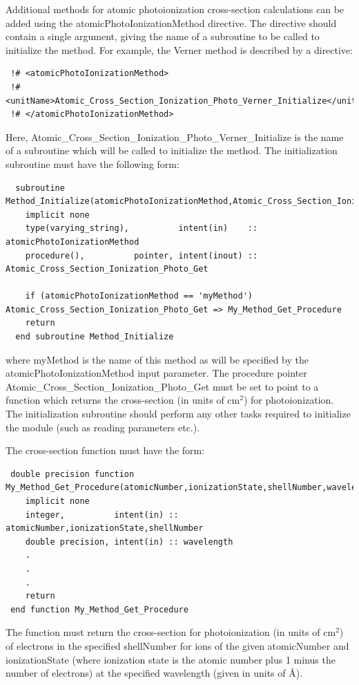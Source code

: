 Additional methods for atomic photoionization cross-section calculations can be added using the {\normalfont \ttfamily atomicPhotoIonizationMethod} directive. The directive should contain a single argument, giving the name of a subroutine to be called to initialize the method. For example, the {\normalfont \ttfamily Verner} method is described by a directive:
\begin{verbatim}
 !# <atomicPhotoIonizationMethod>
 !#  <unitName>Atomic_Cross_Section_Ionization_Photo_Verner_Initialize</unitName>
 !# </atomicPhotoIonizationMethod>
\end{verbatim}
Here, {\normalfont \ttfamily Atomic\_Cross\_Section\_Ionization\_Photo\_Verner\_Initialize} is the name of a subroutine which will be called to initialize the method. The initialization subroutine must have the following form:
\begin{verbatim}
  subroutine Method_Initialize(atomicPhotoIonizationMethod,Atomic_Cross_Section_Ionization_Photo_Get)
    implicit none
    type(varying_string),          intent(in)    :: atomicPhotoIonizationMethod
    procedure(),          pointer, intent(inout) :: Atomic_Cross_Section_Ionization_Photo_Get
    
    if (atomicPhotoIonizationMethod == 'myMethod') Atomic_Cross_Section_Ionization_Photo_Get => My_Method_Get_Procedure
    return
  end subroutine Method_Initialize
\end{verbatim}
where {\normalfont \ttfamily myMethod} is the name of this method as will be specified by the {\normalfont \ttfamily atomicPhotoIonizationMethod} input parameter. The procedure pointer {\normalfont \ttfamily Atomic\_Cross\_Section\_Ionization\_Photo\_Get} must be set to point to a function which returns the cross-section (in units of cm$^2$) for photoionization. The initialization subroutine should perform any other tasks required to initialize the module (such as reading parameters etc.).

The cross-section function must have the form:
\begin{verbatim}
 double precision function My_Method_Get_Procedure(atomicNumber,ionizationState,shellNumber,wavelength)
    implicit none
    integer,          intent(in) :: atomicNumber,ionizationState,shellNumber
    double precision, intent(in) :: wavelength
    .
    .
    .
    return
 end function My_Method_Get_Procedure
\end{verbatim}
The function must return the cross-section for photoionization (in units of cm$^2$) of electrons in the specified {\normalfont \ttfamily shellNumber} for ions of the given {\normalfont \ttfamily atomicNumber} and {\normalfont \ttfamily ionizationState} (where ionization state is the atomic number plus 1 minus the number of electrons) at the specified {\normalfont \ttfamily wavelength} (given in units of \AA).

